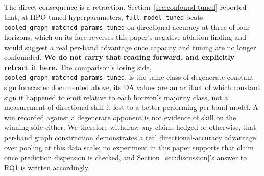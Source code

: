 \documentclass[journal]{IEEEtran}
\begin{document}
The direct consequence is a retraction. Section~\ref{sec:confound-tuned} reported that, at HPO-tuned hyperparameters, \texttt{full\_model\_tuned} beats \texttt{pooled\_graph\_matched\_params\_tuned} on directional accuracy at three of four horizons, which on its face reverses this paper's negative ablation finding and would suggest a real per-band advantage once capacity and tuning are no longer confounded. \textbf{We do not carry that reading forward, and explicitly retract it here.} The comparison's losing side, \texttt{pooled\_graph\_matched\_params\_tuned}, is the same class of degenerate constant-sign forecaster documented above; its DA values are an artifact of which constant sign it happened to emit relative to each horizon's majority class, not a measurement of directional skill it lost to a better-performing per-band model. A win recorded against a degenerate opponent is not evidence of skill on the winning side either. We therefore withdraw any claim, hedged or otherwise, that per-band graph construction demonstrates a real directional-accuracy advantage over pooling at this data scale; no experiment in this paper supports that claim once prediction dispersion is checked, and Section~\ref{sec:discussion}'s answer to RQ1 is written accordingly.
\end{document}
